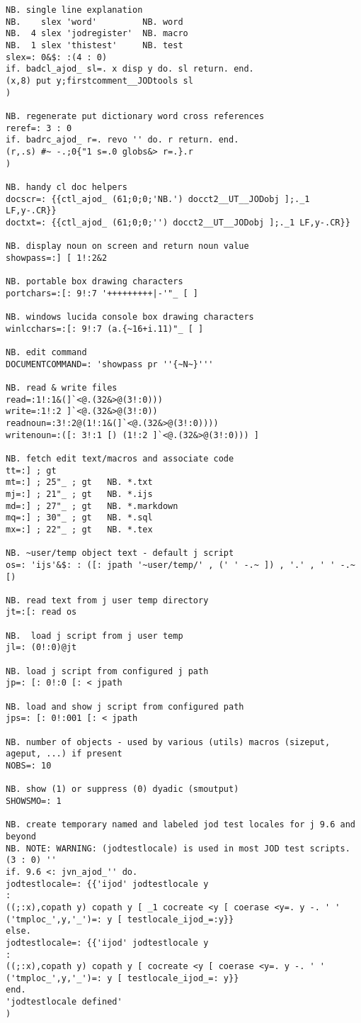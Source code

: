 \begin{lstlisting}[frame=single,framerule=0pt,basicstyle=\ttfamily\footnotesize]
NB. single line explanation 
NB.    slex 'word'         NB. word
NB.  4 slex 'jodregister'  NB. macro
NB.  1 slex 'thistest'     NB. test
slex=: 0&$: :(4 : 0)
if. badcl_ajod_ sl=. x disp y do. sl return. end.
(x,8) put y;firstcomment__JODtools sl
)

NB. regenerate put dictionary word cross references
reref=: 3 : 0
if. badrc_ajod_ r=. revo '' do. r return. end.
(r,.s) #~ -.;0{"1 s=.0 globs&> r=.}.r
)

NB. handy cl doc helpers
docscr=: {{ctl_ajod_ (61;0;0;'NB.') docct2__UT__JODobj ];._1 LF,y-.CR}}
doctxt=: {{ctl_ajod_ (61;0;0;'') docct2__UT__JODobj ];._1 LF,y-.CR}}

NB. display noun on screen and return noun value
showpass=:] [ 1!:2&2

NB. portable box drawing characters
portchars=:[: 9!:7 '+++++++++|-'"_ [ ]

NB. windows lucida console box drawing characters
winlcchars=:[: 9!:7 (a.{~16+i.11)"_ [ ]

NB. edit command 
DOCUMENTCOMMAND=: 'showpass pr ''{~N~}'''

NB. read & write files
read=:1!:1&(]`<@.(32&>@(3!:0)))
write=:1!:2 ]`<@.(32&>@(3!:0))
readnoun=:3!:2@(1!:1&(]`<@.(32&>@(3!:0))))
writenoun=:([: 3!:1 [) (1!:2 ]`<@.(32&>@(3!:0))) ]

NB. fetch edit text/macros and associate code
tt=:] ; gt
mt=:] ; 25"_ ; gt   NB. *.txt
mj=:] ; 21"_ ; gt   NB. *.ijs
md=:] ; 27"_ ; gt   NB. *.markdown
mq=:] ; 30"_ ; gt   NB. *.sql
mx=:] ; 22"_ ; gt   NB. *.tex

NB. ~user/temp object text - default j script
os=: 'ijs'&$: : ([: jpath '~user/temp/' , (' ' -.~ ]) , '.' , ' ' -.~ [)
 
NB. read text from j user temp directory
jt=:[: read os
 
NB.  load j script from j user temp
jl=: (0!:0)@jt

NB. load j script from configured j path
jp=: [: 0!:0 [: < jpath

NB. load and show j script from configured path
jps=: [: 0!:001 [: < jpath

NB. number of objects - used by various (utils) macros (sizeput, ageput, ...) if present
NOBS=: 10

NB. show (1) or suppress (0) dyadic (smoutput)
SHOWSMO=: 1

NB. create temporary named and labeled jod test locales for j 9.6 and beyond
NB. NOTE: WARNING: (jodtestlocale) is used in most JOD test scripts.
(3 : 0) ''
if. 9.6 <: jvn_ajod_'' do.
jodtestlocale=: {{'ijod' jodtestlocale y 
: 
((;:x),copath y) copath y [ _1 cocreate <y [ coerase <y=. y -. ' '
('tmploc_',y,'_')=: y [ testlocale_ijod_=:y}}
else.
jodtestlocale=: {{'ijod' jodtestlocale y 
: 
((;:x),copath y) copath y [ cocreate <y [ coerase <y=. y -. ' '
('tmploc_',y,'_')=: y [ testlocale_ijod_=: y}}
end.
'jodtestlocale defined'
)


\end{lstlisting}
